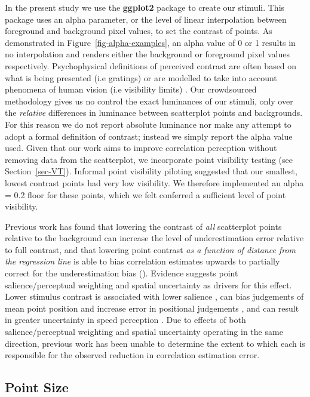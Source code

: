 \documentclass[manuscript, review, anonymous, screen]{acmart}
\begin{document}
In the present study we use the \textbf{ggplot2} package
\citep{hadley_gg2016} to create our stimuli. This package uses an alpha
parameter, or the level of linear interpolation \citep{stone_2008}
between foreground and background pixel values, to set the contrast of
points. As demonstrated in Figure~\ref{fig-alpha-examples}, an alpha
value of 0 or 1 results in no interpolation and renders either the
background or foreground pixel values respectively. Psychophysical
definitions of perceived contrast are often based on what is being
presented (i.e gratings) or are modelled to take into account phenomena
of human vision (i.e visibility limits) \citep{zuffi_2007}. Our
crowdsourced methodology gives us no control the exact luminances of our
stimuli, only over the \emph{relative} differences in luminance between
scatterplot points and backgrounds. For this reason we do not report
absolute luminance nor make any attempt to adopt a formal definition of
contrast; instead we simply report the alpha value used. Given that our
work aims to improve correlation perception without removing data from
the scatterplot, we incorporate point visibility testing (see
Section~\ref{sec-VT}). Informal point visibility piloting suggested that
our smallest, lowest contrast points had very low visibility. We
therefore implemented an alpha = 0.2 floor for these points, which we
felt conferred a sufficient level of point visibility.

Previous work has found that lowering the contrast of \emph{all}
scatterplot points relative to the background can increase the level of
underestimation error relative to full contrast, and that lowering point
contrast \emph{as a function of distance from the regression line} is
able to bias correlation estimates upwards to partially correct for the
underestimation bias (\citet{strain_2023}). Evidence suggests point
salience/perceptual weighting and spatial uncertainty as drivers for
this effect. Lower stimulus contrast is associated with lower salience
\citep{healey_2012}, can bias judgements of mean point position
\citep{hong_2021} and increase error in positional judgements
\citep{wehrhahn_1990}, and can result in greater uncertainty in speed
perception \citep{champion_2017}. Due to effects of both
salience/perceptual weighting and spatial uncertainty operating in the
same direction, previous work \citep{strain_2023} has been unable to
determine the extent to which each is responsible for the observed
reduction in correlation estimation error.

\hypertarget{sec-point-size}{%
\subsection{Point Size}\label{sec-point-size}}
\end{document}
